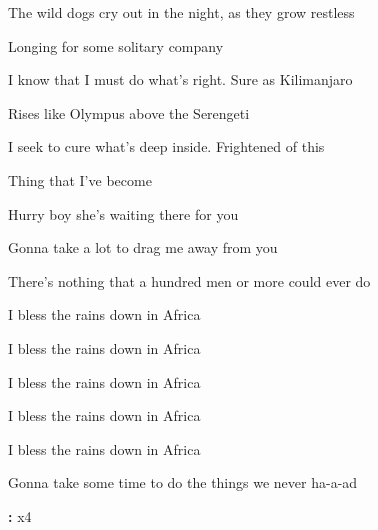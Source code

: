 \begin{song}
\bigskip

 The wild dogs cry out in the night, as they grow restless \par
{}Longing for some solitary company  \par
{} I know that I must do what's right. Sure as Kilimanjaro \par
{}Rises like Olympus above the Serengeti  \par
{} I seek to cure what's deep inside. Frightened of this \par
{}Thing that I've become  \par

\bigskip

\Chorus \par

\bigskip

         \par
{}   Hurry boy she's waiting there for you  \par

\bigskip

 Gonna take a lot to drag me away from you \par
{} There's nothing that a hundred men or more could ever do \par
{} I bless the rains down in Africa \par
{} I bless the rains down in Africa  \par
{} I bless the rains down in Africa  \par
{} I bless the rains down in Africa \par
{} I bless the rains down in Africa  \par
{} Gonna take some time to do the things we never ha-a-ad \par

\bigskip

\Outro\textbf{:}    x4 \par

\end{song}